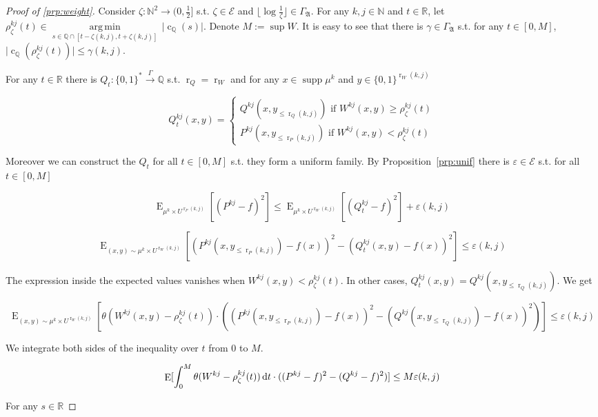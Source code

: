 \documentclass{article}
\numberwithin{equation}{section}
\theoremstyle{definition}
\theoremstyle{plain}
\newcommand{\Words}{{\{ 0, 1 \}^*}}
\newcommand{\WordsLen}[1]{{\{ 0, 1 \}^{#1}}}
\DeclareMathOperator{\Supp}{supp}
\DeclareMathOperator{\E}{E}
\DeclareMathOperator{\R}{r}
\DeclareMathOperator{\En}{c}
\newcommand{\Argmin}[1]{\underset{#1}{\operatorname{arg\,min}}\,}
\newcommand{\Nats}{\mathbb{N}}
\newcommand{\Rats}{\mathbb{Q}}
\newcommand{\Reals}{\mathbb{R}}
\newcommand{\Abs}[1]{\lvert #1 \rvert}
\newcommand{\Floor}[1]{\lfloor #1 \rfloor}
\begin{document}
\begin{proof}[Proof of \ref{prp:weight}]

Consider $\zeta: \Nats^2 \rightarrow (0,\frac{1}{2}]$ s.t.  $\zeta \in \mathcal{E}$ and $\Floor{\log \frac{1}{\zeta}} \in \Gamma_{\mathfrak{A}}$. For any $k,j \in \Nats$ and $t \in \Reals$, let $\rho_\zeta^{kj}(t) \in \Argmin{s \in \Rats \cap [t-\zeta(k,j),t+\zeta(k,j)]} \Abs{\En_\Rats(s)}$. Denote $M:= \sup W$. It is easy to see that there is $\gamma \in \Gamma_{\mathfrak{A}}$ s.t. for any $t \in [0, M]$, ${\Abs{\En_\Rats(\rho_\zeta^{kj}(t))} \leq \gamma(k,j)}$.

For any $t \in \Reals$ there is $Q_t: \Words \xrightarrow{\Gamma} \Rats$ s.t. $\R_Q=\R_W$ and for any $x \in \Supp \mu^k$ and ${y \in \WordsLen{\R_W(k,j)}}$

$$Q_t^{kj}(x,y)=\begin{cases}Q^{kj}(x,y_{\leq \R_Q(k,j)}) \text{ if } W^{kj}(x,y) \geq \rho^{kj}_\zeta(t) \\ P^{kj}(x,y_{\leq \R_P(k,j)}) \text{ if } W^{kj}(x,y) < \rho^{kj}_\zeta(t)\end{cases}$$

Moreover we can construct the $Q_t$ for all $t \in [0, M]$ s.t. they form a uniform family. By Proposition~\ref{prp:unif} there is $\varepsilon \in \mathcal{E}$ s.t. for all $t \in [0, M]$

$$\E_{\mu^k \times U^{\R_P(k,j)}}[(P^{kj}-f)^2] \leq \E_{\mu^k \times U^{\R_W(k,j)}}[(Q_t^{kj}-f)^2] + \varepsilon(k,j)$$

$$\E_{(x,y) \sim \mu^k \times U^{\R_W(k,j)}}[(P^{kj}(x,y_{\leq \R_P(k,j)})-f(x))^2-(Q_t^{kj}(x,y)-f(x))^2] \leq \varepsilon(k,j)$$

The expression inside the expected values vanishes when $W^{kj}(x,y) < \rho^{kj}_\zeta(t)$. In other cases, $Q_t^{kj}(x,y) = Q^{kj}(x,y_{\leq \R_Q(k,j)})$. We get

$$\E_{(x,y) \sim \mu^k \times U^{\R_W(k,j)}}[\theta(W^{kj}(x,y)-\rho_\zeta^{kj}(t)) \cdot ((P^{kj}(x,y_{\leq \R_P(k,j)})-f(x))^2-(Q^{kj}(x,y_{\leq \R_Q(k,j)})-f(x))^2)] \leq \varepsilon(k,j)$$

We integrate both sides of the inequality over $t$ from 0 to $M$.

\begin{equation}
\label{eqn:prp__weight__prf1}
\E[\int_0^M\theta(W^{kj}-\rho_\zeta^{kj}(t)) \dif t \cdot ((P^{kj}-f)^2-(Q^{kj}-f)^2)] \leq M \varepsilon(k,j)
\end{equation}

For any $s \in \Reals$


\end{proof}
\end{document}
